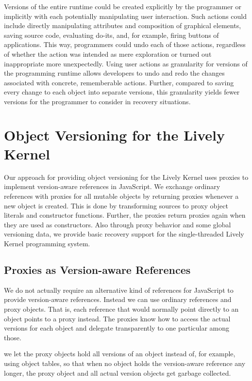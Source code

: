 Versions of the entire runtime could be created explicitly by the programmer or implicitly with each potentially manipulating user interaction.
Such actions could include directly manipulating attributes and composition of graphical elements, saving source code, evaluating do-its, and, for example, firing buttons of applications.
This way, programmers could undo each of those actions, regardless of whether the action was intended as mere exploration or turned out inappropriate more unexpectedly.
Using user actions as granularity for versions of the programming runtime allows developers to undo and redo the changes associated with concrete, rememberable actions.
Further, compared to saving every change to each object into separate versions, this granularity yields fewer versions for the programmer to consider in recovery situations.



\section{Object Versioning for the Lively Kernel}

Our approach for providing object versioning for the Lively Kernel uses proxies to implement version-aware references in JavaScript.
We exchange ordinary references with proxies for all mutable objects by returning proxies whenever a new object is created.
This is done by transforming sources to proxy object literals and constructor functions.
Further, the proxies return proxies again when they are used as constructors.
Also through proxy behavior and some global versioning data, we provide basic recovery support for the single-threaded Lively Kernel programming system.


\subsection{Proxies as Version-aware References}

We do not actually require an alternative kind of references for JavaScript to provide version-aware references.
Instead we can use ordinary references and proxy objects.
That is, each reference that would normally point directly to an object points to a proxy instead.
The proxies know how to access the actual versions for each object and delegate transparently to one particular among those.

we let the proxy objects hold all versions of an object instead of, for example, using object tables, so that when no object holds the version-aware reference any longer, the proxy object and all actual version objects get garbage collected.

